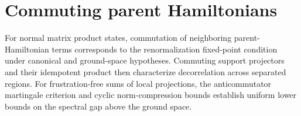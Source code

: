 \chapter{Commuting parent Hamiltonians}
\label{ch:parent_hamiltonian_commuting_and_gap}

For normal matrix product states, commutation of neighboring parent-Hamiltonian
terms corresponds to the renormalization fixed-point condition under canonical
and ground-space hypotheses. Commuting support projectors and their idempotent
product then characterize decorrelation across separated regions. For
frustration-free sums of local projections, the anticommutator martingale
criterion and cyclic norm-compression bounds establish uniform lower bounds on
the spectral gap above the ground space.



